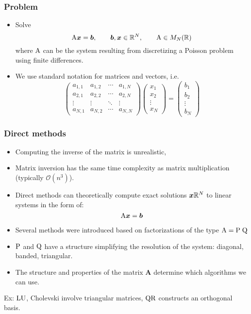 \begin{frame}
  \frametitle{Problem}
  \begin{itemize}
  \item Solve
    \[
      {\mathrm A} \bm x = {\boldsymbol b}, \qquad
      {\boldsymbol b}, \bm x \in \mathbb{R}^N, \qquad
      {\mathrm A} \in {M_N(\mathbb{R})}
    \]
    where ${\mathrm A}$ can be the system resulting from discretizing a Poisson problem
    using finite differences.
  \bigskip
  \item We use standard notation for matrices and vectors, i.e.
    \[
      \begin{pmatrix}
        a_{1,1} & a_{1,2} & \cdots & a_{1,N} \\
        a_{2,1} & a_{2,2} & \cdots & a_{2,N} \\
        \vdots  & \vdots  & \ddots & \vdots  \\
        a_{N,1} & a_{N,2} & \cdots & a_{N,N}
      \end{pmatrix}
      \begin{pmatrix} x_1 \\ x_2 \\ \vdots \\ x_N \end{pmatrix} =
      \begin{pmatrix} b_1 \\ b_2 \\ \vdots \\ b_N \end{pmatrix}
    \]
  \end{itemize}
\end{frame}

\begin{frame}
  \frametitle{Direct methods}
  \begin{itemize}
  \item Computing the inverse of the matrix is unrealistic,
  \item Matrix inversion has the same time complexity as matrix multiplication
    (typically $\mathcal{O}(n^3)$).
  \item Direct methods can theoretically compute exact solutions ${\boldsymbol x}{\mathbb{R}^N}$ to linear systems in the form of:
\[
{\mathrm A} {\boldsymbol x} = {\boldsymbol b}
\]
  \item Several methods were introduced based on factorizations of the type ${\mathrm A} = {\mathrm P}\;{\mathrm Q}$
  \item ${\mathrm P}$ and ${\mathrm Q}$ have a structure simplifying the resolution of the system: diagonal, banded, triangular.
  \item The structure and properties of the matrix $\bm A$ determine which
    algorithms we can use.
  \end{itemize}

Ex: ${\mathrm L}{\mathrm U}$, Cholevski involve triangular matrices, ${\mathrm Q}{\mathrm R}$  constructs an orthogonal basis.
\end{frame}

